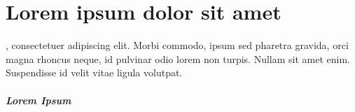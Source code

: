 \chapter{Lorem ipsum dolor sit amet}
    \label{chap:conclusion}
    
, consectetuer adipiscing elit. Morbi commodo, ipsum sed pharetra gravida, orci magna rhoncus neque, id pulvinar odio lorem non turpis. Nullam sit amet enim. Suspendisse id velit vitae ligula volutpat.

\paragraph{Lorem Ipsum} \lipsum[2]

\lipsum[3]